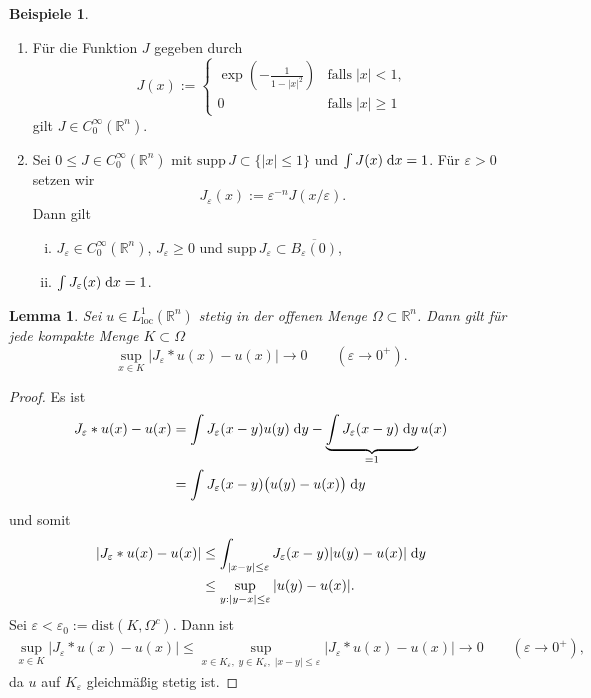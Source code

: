 \documentclass[
paper=a4,
bibtotocnumbered,
liststotocnumbered,
tablecaptionabove,
pointlessnumbers,
twoside,
openright,
10pt
]
{report}
\newcommand{\supp}{\mathrm{supp}\,}
\newcommand{\dist}{\mathrm{dist}}
\let\epsilon\varepsilon
\newtheorem{lem}[thm]{Lemma}
\theoremstyle{definition}
\newtheorem*{bspe}{Beispiele}
\numberwithin{equation}{chapter}
\begin{document}
\begin{bspe}
\begin{enumerate}[\bf (a)]
\item Für die Funktion $J$ gegeben durch
\begin{equation}
J(x):=
\begin{cases}
\exp\left(-\frac{1}{1-|x|^2}\right) &\mathrm{falls}\; |x|<1,\\
0 &\mathrm{falls}\; |x|\geq 1
\end{cases}
\end{equation}
gilt $J\in C_0^\infty(\mathbb{R}^n)$.
\item Sei $0\leq J\in C_0^\infty(\mathbb{R}^n)$ mit $\supp J\subset \{|x|\leq 1\}$ und $\int J(x)\;\mathrm{d} x=1$. Für $\epsilon>0$ setzen wir
\begin{equation}
J_\epsilon(x):=\epsilon^{-n} J(x/\epsilon).
\end{equation}
Dann gilt
\begin{enumerate}[(i)]
\item $J_\epsilon\in C_0^\infty(\mathbb{R}^n)$, $J_\epsilon\geq 0$ und $\supp J_\epsilon\subset\overline{B_\epsilon(0)}$,
\item $\int J_\epsilon(x)\d x =1$.
\end{enumerate}
\end{enumerate}
\end{bspe}

\begin{lem}\label{lem6}
Sei $u\in L_\mathrm{loc}^1(\mathbb{R}^n)$ stetig in der offenen Menge $\Omega\subset\mathbb{R}^n$. Dann gilt für jede kompakte Menge $K\subset\Omega$
\begin{equation}
\sup\limits_{x\in K} |J_\epsilon\ast u(x)-u(x)|\rightarrow 0\qquad (\epsilon\rightarrow 0^+).
\end{equation}
\end{lem}

\begin{proof}
Es ist
\begin{align}
J_\epsilon\ast u(x)-u(x)
&= \int J_\epsilon(x-y)u(y)\d y - \underbrace{\int J_\epsilon(x-y)\d y}_{=1} u(x) \\
&= \int J_\epsilon(x-y)\big( u(y)-u(x)\big)\d y
\end{align}
und somit
\begin{align}
\left |J_\epsilon\ast u(x)-u(x)\right| 
&\leq \int_{|x-y|\leq\epsilon} J_\epsilon(x-y) |u(y)-u(x)| \d y \\
&\leq\sup\limits_{y:|y-x|\leq \epsilon} |u(y)-u(x)|.
\end{align}
Sei $\epsilon <\epsilon_0:=\dist(K,\Omega^c)$. Dann ist
\begin{align}
\sup\limits_{x\in K} \left |J_\epsilon\ast u(x)-u(x)\right|  
\leq \sup\limits_{x\in K_\epsilon,\; y\in K_\epsilon,\;|x-y|\leq\epsilon} \left |J_\epsilon\ast u(x)-u(x)\right|   \rightarrow0 \qquad (\epsilon\rightarrow 0^+),
\end{align}
da $u$ auf $K_\epsilon$ gleichmäßig stetig ist. 
\end{proof}
\end{document}
